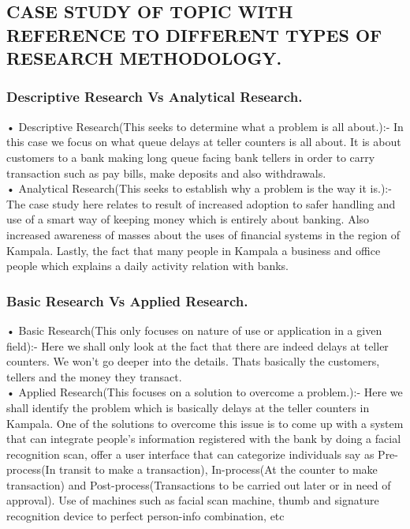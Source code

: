 \documentclass[10pt,a4paper]{report}
\begin{document}
\begin{flushleft}
\subsection*{CASE STUDY OF TOPIC WITH REFERENCE TO DIFFERENT TYPES OF RESEARCH METHODOLOGY.}


	 \subsubsection*{Descriptive Research  Vs Analytical Research.}
	 
\begin{flushleft}
	
•	Descriptive Research(This seeks to determine what a problem is all about.):-
In this case we focus on what queue delays at teller counters is all about. It is about customers to a bank making long queue facing bank tellers in order to carry transaction such as pay bills, make deposits and also withdrawals.\\

•	Analytical Research(This seeks to establish why a problem is the way it is.):-
The case study here relates to result of increased adoption to safer handling and use of a smart way of keeping money which is entirely about banking. Also increased awareness of masses about the uses of financial systems in the region of Kampala. Lastly, the fact that many people in Kampala a business and office people which explains a daily activity relation with banks. 		
	\end{flushleft}	


 \subsubsection*{Basic Research Vs Applied Research.}
\begin{flushleft}

•	Basic Research(This only focuses on nature of use or application in a given field):- Here we shall only look at the fact that there are indeed delays at teller counters. We won’t go deeper into the details. Thats basically the customers, tellers and the money they transact.\\


•	Applied Research(This focuses on a solution to overcome a problem.):-
Here we shall identify the problem which is basically delays at the teller counters in Kampala. One of the solutions to overcome this issue is to come up with a system that can integrate people’s information registered with the bank  by doing a facial recognition scan, offer a user interface that can categorize individuals say as Pre-process(In transit to make a transaction), In-process(At the counter to make transaction) and Post-process(Transactions to be carried out later or in need of approval). Use of machines such as facial scan machine, thumb and signature recognition device to perfect person-info combination, etc
\end{flushleft}
 



\end{flushleft}
\end{document}
